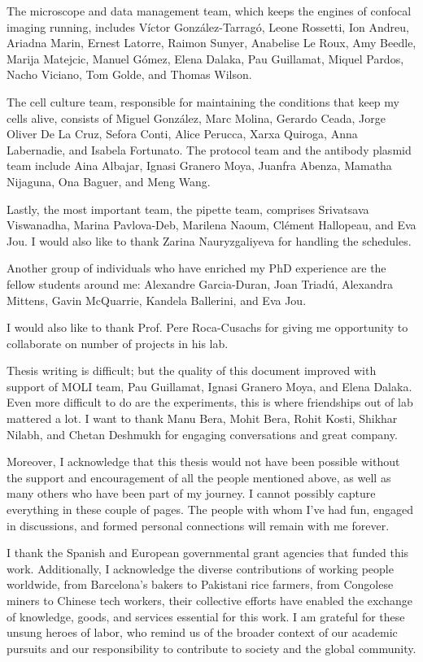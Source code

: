 \begin{Acknowledgements}
	The microscope and data management team, which keeps the engines of confocal imaging running, includes Víctor González-Tarragó, Leone Rossetti, Ion Andreu, Ariadna Marin, Ernest Latorre, Raimon Sunyer, Anabelise Le Roux, Amy Beedle, Marija Matejcic, Manuel Gómez, Elena Dalaka, Pau Guillamat, Miquel Pardos, Nacho Viciano, Tom Golde, and Thomas Wilson.
	
	The cell culture team, responsible for maintaining the conditions that keep my cells alive, consists of Miguel González, Marc Molina, Gerardo Ceada, Jorge Oliver De La Cruz, Sefora Conti, Alice Perucca, Xarxa Quiroga, Anna Labernadie, and Isabela Fortunato. The protocol team and the antibody plasmid team include Aina Albajar, Ignasi Granero Moya, Juanfra Abenza, Mamatha Nijaguna, Ona Baguer, and Meng Wang.
	
	Lastly, the most important team, the pipette team, comprises Srivatsava Viswanadha, Marina Pavlova-Deb, Marilena Naoum, Clément Hallopeau, and Eva Jou. I would also like to thank Zarina Nauryzgaliyeva for handling the schedules.
	
	Another group of individuals who have enriched my PhD experience are the fellow students around me: Alexandre Garcia-Duran, Joan Triadú, Alexandra Mittens, Gavin McQuarrie, Kandela Ballerini, and Eva Jou.
	
	I would also like to thank Prof. Pere Roca-Cusachs for giving me opportunity to collaborate on number of projects in his lab.
	
	Thesis writing is difficult; but the quality of this document improved with support of MOLI team, Pau Guillamat, Ignasi Granero Moya, and Elena Dalaka. Even more difficult to do are the experiments, this is where friendships out of lab mattered a lot. I want to thank Manu Bera, Mohit Bera, Rohit Kosti, Shikhar Nilabh, and Chetan Deshmukh for engaging conversations and great company.
	
	Moreover, I acknowledge that this thesis would not have been possible without the support and encouragement of all the people mentioned above, as well as many others who have been part of my journey. I cannot possibly capture everything in these couple of pages. The people with whom I've had fun, engaged in discussions, and formed personal connections will remain with me forever.
	
	I thank the Spanish and European governmental grant agencies that funded this work. Additionally, I acknowledge the diverse contributions of working people worldwide, from Barcelona's bakers to Pakistani rice farmers, from  Congolese miners to Chinese tech workers, their collective efforts have enabled the exchange of knowledge, goods, and services essential for this work. I am grateful for these unsung heroes of labor, who remind us of the broader context of our academic pursuits and our responsibility to contribute to society and the global community.
	

\end{Acknowledgements}
